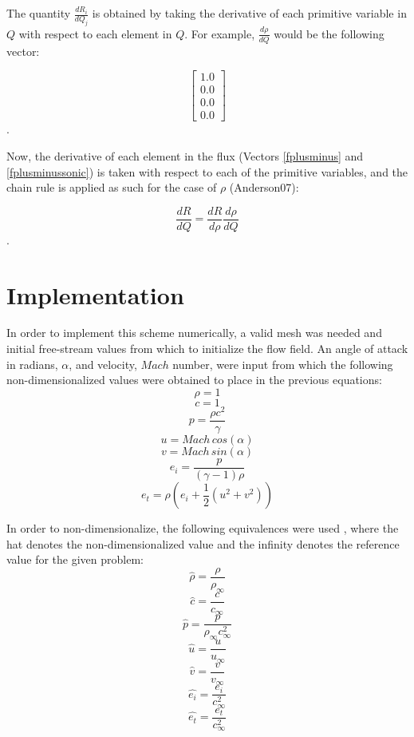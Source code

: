 \documentclass[letterpaper,twoside,11pt,openright,pdf]{book} %
\begin{document}
The quantity \(\frac{dR_i}{dQ_j}\) is obtained by taking the derivative of each primitive variable in \(Q\) with respect to each element in \(Q\).  For example, \(\frac{d\rho}{dQ}\) would be the following vector:

\[\left[ \begin{array}{c} 1.0 \\ 0.0 \\ 0.0 \\ 0.0 \end{array} \right] \].

Now, the derivative of each element in the flux (Vectors \ref{fplusminus} and \ref{fplusminussonic}) is taken with respect to each of the primitive variables, and the chain rule is applied as such for the case of \(\rho\) (Anderson07):

\[\frac{dR}{dQ} = \frac{dR}{d\rho}\frac{d\rho}{dQ}\].

\section{Implementation}

In order to implement this scheme numerically, a valid mesh was needed and initial free-stream values from which to initialize the flow field.  An angle of attack in radians, \(\alpha\), and velocity, \(Mach\) number, were input from which the following non-dimensionalized values were obtained to place in the previous equations:
\[\rho = 1\]
\[c = 1\]
\[p = \frac{\rho c^2}{\gamma}\]
\[u = Mach\,cos(\alpha)\]
\[v = Mach\,sin(\alpha)\]
\[e_i = \frac{p}{(\gamma-1)\rho}\]
\[e_t = \rho(e_i+\frac{1}{2}(u^2+v^2))\]

In order to non-dimensionalize, the following equivalences were used , where the hat denotes the non-dimensionalized value and the infinity denotes the reference value for the given problem:
\[\hat{\rho} = \frac{\rho}{\rho_{\infty}}\]
\[\hat{c} = \frac{c}{c_{\infty}}\]
\[\hat{p} = \frac{p}{\rho_{\infty}c^2_{\infty}}\]
\[\hat{u} = \frac{u}{u_{\infty}}\]
\[\hat{v} = \frac{v}{v_{\infty}}\]
\[\hat{e_i} = \frac{e_i}{c^2_{\infty}}\]
\[\hat{e_t} = \frac{e_t}{c^2_{\infty}}\]
\end{document}
